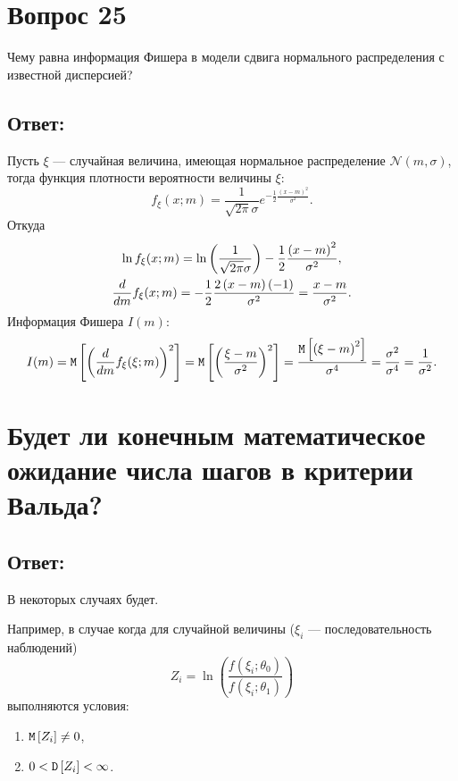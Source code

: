 \documentclass[12pt]{article}
\begin{document}
    \section*{Вопрос 25}
    Чему равна информация Фишера в модели сдвига нормального распределения с известной дисперсией?

    \subsection*{Ответ:}
    Пусть $\xi$ --- случайная величина, имеющая нормальное распределение $\mathcal{N} \left ( m, \sigma \right)$, тогда функция плотности вероятности величины $\xi$:
    \[
        f_\xi(x;m) = \frac{1}{\sqrt{2 \pi} \sigma} e^{- \frac{1}{2} \frac{\left ( x-m \right)^2}{\sigma^2}}.
    \]
    Откуда
    \begin{gather}
        \ln f_\xi(x;m) = \ln \left ( \frac{1}{\sqrt{2 \pi} \sigma} \right ) - \frac{1}{2} \frac{\left ( x-m \right)^2}{\sigma^2} , \\
        \frac{d}{d m} f_\xi(x;m) =  - \frac{1}{2} \frac{2 \left ( x-m \right ) (-1)}{\sigma^2} = \frac{x-m}{\sigma^2} .
    \end{gather}
    Информация Фишера $I(m)$:
    \[
        I(m)
        = \mathtt{M} \left [ \left ( \frac{d}{d m} f_\xi(\xi;m) \right )^2 \right ]
        = \mathtt{M} \left [ \left ( \frac{\xi-m}{\sigma^2} \right )^2 \right ]
        = \frac{\mathtt{M} \left [ \left ( \xi - m \right )^2 \right ]}{\sigma^4}
        = \frac{\sigma^2}{\sigma^4}
        = \frac{1}{\sigma^2}.
    \]

    \section*{Будет ли конечным математическое ожидание числа шагов в критерии Вальда?}
    \subsection*{Ответ:}
    В некоторых случаях будет.

    Например, в случае когда для случайной величины ($\xi_i$ --- последовательность наблюдений)
    \[
        Z_i = \ln \left ( \frac{f(\xi_i; \theta_0)}{f(\xi_i; \theta_1)} \right )
    \]
    выполняются условия:
    \begin{enumerate}
        \item $\mathtt{M} \left [ Z_i \right ] \neq 0$,
        \item $0 < \mathtt{D} \left [ Z_i \right ] < \infty$.
    \end{enumerate}
\end{document}
